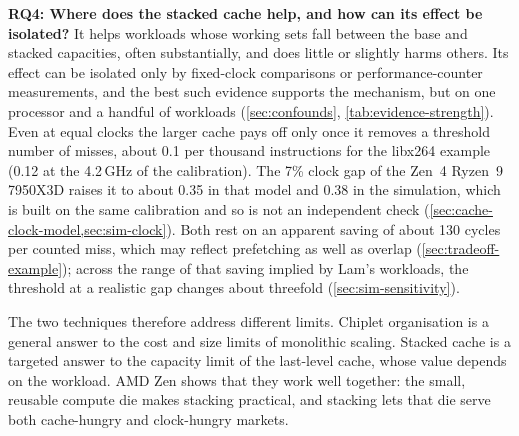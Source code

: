 \textbf{RQ4: Where does the stacked cache help, and how can its effect be isolated?} It helps workloads whose working sets fall between the base and stacked capacities, often substantially, and does little or slightly harms others. Its effect can be isolated only by fixed-clock comparisons or performance-counter measurements, and the best such evidence supports the mechanism, but on one processor and a handful of workloads (\cref{sec:confounds}, \cref{tab:evidence-strength}). Even at equal clocks the larger cache pays off only once it removes a threshold number of misses, about 0.1 per thousand instructions for the libx264 example (0.12 at the 4.2\,GHz of the calibration). The 7\% clock gap of the Zen~4 Ryzen~9 7950X3D raises it to about 0.35 in that model and 0.38 in the simulation, which is built on the same calibration and so is not an independent check (\cref{sec:cache-clock-model,sec:sim-clock}). Both rest on an apparent saving of about 130 cycles per counted miss, which may reflect prefetching as well as overlap (\cref{sec:tradeoff-example}); across the range of that saving implied by Lam's workloads, the threshold at a realistic gap changes about threefold (\cref{sec:sim-sensitivity}).

The two techniques therefore address different limits. Chiplet organisation is a general answer to the cost and size limits of monolithic scaling. Stacked cache is a targeted answer to the capacity limit of the last-level cache, whose value depends on the workload. AMD Zen shows that they work well together: the small, reusable compute die makes stacking practical, and stacking lets that die serve both cache-hungry and clock-hungry markets.

